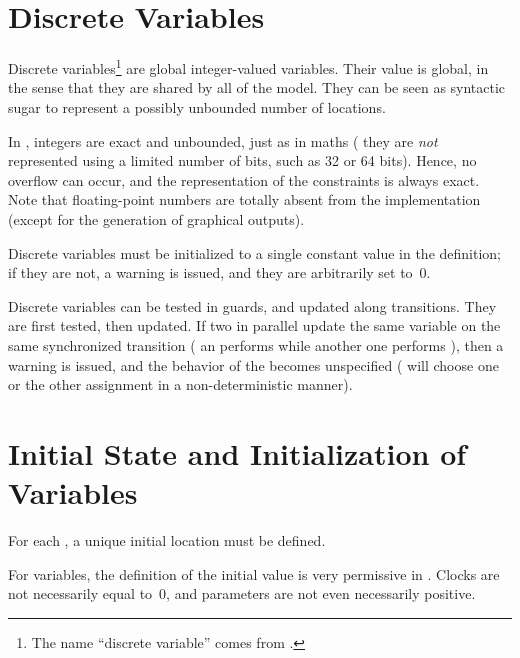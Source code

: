 \section{Discrete Variables}\label{section:discrete}

Discrete variables\footnote{%
	The name ``discrete variable'' comes from \hytech{}.
}
are global integer-valued variables.
Their value is global, in the sense that they are shared by all \IPTA{} of the model.
They can be seen as syntactic sugar to represent a possibly unbounded number of locations.

In \imitator{}, integers are exact and unbounded, just as in maths (\ie{} they are \emph{not} represented using a limited number of bits, such as 32 or 64 bits).
Hence, no overflow can occur, and the representation of the constraints is always exact.
Note that floating-point numbers are totally absent from the \imitator{} implementation (except for the generation of graphical outputs).

Discrete variables must be initialized to a single constant value in the  definition;
if they are not, a warning is issued, and they are arbitrarily set to~0.

Discrete variables can be tested in guards, and updated along transitions.
They are first tested, then updated.
If two \IPTA{} in parallel update the same variable on the same synchronized transition (\eg{} an \IPTA{} performs  while another one performs ), then a warning is issued, and the behavior of the \NIPTA{} becomes unspecified (\ie{} \imitator{} will choose one or the other assignment in a non-deterministic manner).



\section{Initial State and Initialization of Variables}\label{section:init}

For each \IPTA{}, a unique initial location must be defined.

For variables, the definition of the initial value is very permissive in \imitator{}.
Clocks are not necessarily equal to~0, and parameters are not even necessarily positive.

